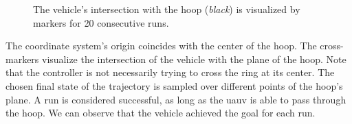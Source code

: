 \begin{figure}
	\centering
    \caption{The vehicle's intersection with the hoop (\emph{black}) is visualized by markers for 20 consecutive runs. }
    \label{fig:hoop-experiment}
\end{figure}
The coordinate system's origin coincides with the center of the hoop. The cross-markers visualize the intersection of the vehicle with the plane of the hoop. Note that the controller is not necessarily trying to cross the ring at its center. The chosen final state of the trajectory is sampled over different points of the hoop's plane. A run is considered successful, as long as the \ac{uauv} is able to pass through the hoop. We can observe that the vehicle achieved the goal for each run.


